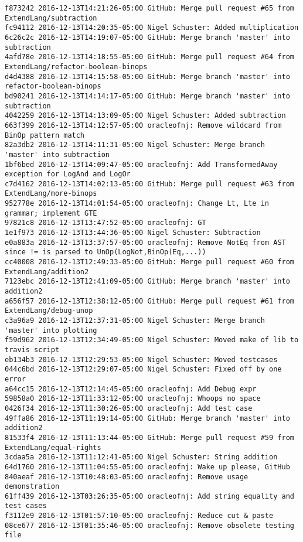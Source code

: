 \begin{lstlisting}
f873242 2016-12-13T14:21:26-05:00 GitHub: Merge pull request #65 from ExtendLang/subtraction
fc94112 2016-12-13T14:20:35-05:00 Nigel Schuster: Added multiplication
6c26c2c 2016-12-13T14:19:07-05:00 GitHub: Merge branch 'master' into subtraction
4afd78e 2016-12-13T14:18:55-05:00 GitHub: Merge pull request #64 from ExtendLang/refactor-boolean-binops
d4d4388 2016-12-13T14:15:58-05:00 GitHub: Merge branch 'master' into refactor-boolean-binops
bd90241 2016-12-13T14:14:17-05:00 GitHub: Merge branch 'master' into subtraction
4042259 2016-12-13T14:13:09-05:00 Nigel Schuster: Added subtraction
663f399 2016-12-13T14:12:57-05:00 oracleofnj: Remove wildcard from BinOp pattern match
82a3db2 2016-12-13T14:11:31-05:00 Nigel Schuster: Merge branch 'master' into subtraction
1bf6bed 2016-12-13T14:09:47-05:00 oracleofnj: Add TransformedAway exception for LogAnd and LogOr
c7d4162 2016-12-13T14:02:13-05:00 GitHub: Merge pull request #63 from ExtendLang/more-binops
952778e 2016-12-13T14:01:54-05:00 oracleofnj: Change Lt, Lte in grammar; implement GTE
97821c8 2016-12-13T13:47:52-05:00 oracleofnj: GT
1e1f973 2016-12-13T13:44:36-05:00 Nigel Schuster: Subtraction
e0a883a 2016-12-13T13:37:57-05:00 oracleofnj: Remove NotEq from AST since != is parsed to UnOp(LogNot,BinOp(Eq,...))
cc40008 2016-12-13T12:49:33-05:00 GitHub: Merge pull request #60 from ExtendLang/addition2
7123ebc 2016-12-13T12:41:09-05:00 GitHub: Merge branch 'master' into addition2
a656f57 2016-12-13T12:38:12-05:00 GitHub: Merge pull request #61 from ExtendLang/debug-unop
c3a96a9 2016-12-13T12:37:31-05:00 Nigel Schuster: Merge branch 'master' into plotting
f59d962 2016-12-13T12:34:49-05:00 Nigel Schuster: Moved make of lib to travis script
eb134b3 2016-12-13T12:29:53-05:00 Nigel Schuster: Moved testcases
044c6bd 2016-12-13T12:29:07-05:00 Nigel Schuster: Fixed off by one error
a64cc15 2016-12-13T12:14:45-05:00 oracleofnj: Add Debug expr
59858a0 2016-12-13T11:33:12-05:00 oracleofnj: Whoops no space
0426f34 2016-12-13T11:30:26-05:00 oracleofnj: Add test case
49ffa86 2016-12-13T11:19:14-05:00 GitHub: Merge branch 'master' into addition2
81533f4 2016-12-13T11:13:44-05:00 GitHub: Merge pull request #59 from ExtendLang/equal-rights
3cdaa5a 2016-12-13T11:12:41-05:00 Nigel Schuster: String addition
64d1760 2016-12-13T11:04:55-05:00 oracleofnj: Wake up please, GitHub
840aeaf 2016-12-13T10:48:03-05:00 oracleofnj: Remove usage demonstration
61ff439 2016-12-13T03:26:35-05:00 oracleofnj: Add string equality and test cases
f3112e9 2016-12-13T01:57:10-05:00 oracleofnj: Reduce cut & paste
08ce677 2016-12-13T01:35:46-05:00 oracleofnj: Remove obsolete testing file

\end{lstlisting}
